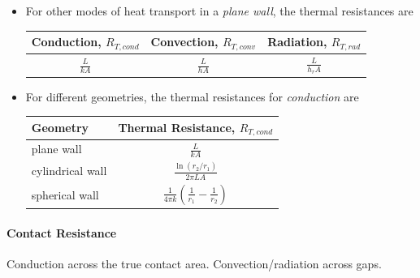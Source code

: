 \documentclass[12pt, a4paper]{article}
\numberwithin{equation}{subsection}
\begin{document}
\begin{itemize}
    \item For other modes of heat transport in a \textit{plane wall}, the thermal resistances are
    \begin{table}[H]
        \centering
        \begin{tabular}{c c c}
        \toprule
        \textbf{Conduction}, $R_{T, cond}$  &   \textbf{Convection}, $R_{T, conv}$  &   \textbf{Radiation}, $R_{T, rad}$ \\ \midrule
        $\displaystyle \frac{L}{kA}$  &   $\displaystyle \frac{L}{hA}$  &   $\displaystyle \frac{L}{h_{r}A}$\\
        \bottomrule
        \end{tabular}
    \end{table}

    \item For different geometries, the thermal resistances for \textit{conduction} are
    \begin{table}[H]
        \centering
        \begin{tabular}{lc}
            \toprule
            \textbf{Geometry}   &  \textbf{Thermal Resistance, $R_{T, cond}$} \\
            \midrule
            plane wall          &  $\displaystyle \frac{L}{kA}$ \\ [1.2em]
            cylindrical wall    &  $\displaystyle \frac{\ln(r_{2}/r_{1})}{2\pi LA}$ \\[1.2em]
            spherical wall      &  $\displaystyle \frac{1}{4\pi k} (\frac{1}{r_{1}}-\frac{1}{r_{2}})$ \\
            \bottomrule
        \end{tabular}
    \end{table}
\end{itemize}

\paragraph{Contact Resistance} Conduction across the true contact area. Convection/radiation across gaps.
\end{document}
